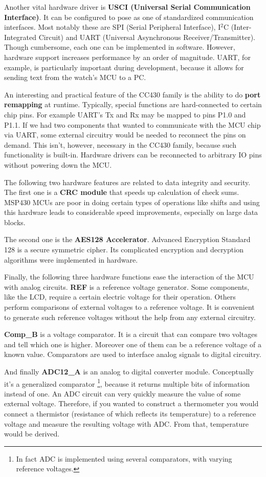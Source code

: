 Another vital hardware driver is {\bf USCI (Universal Serial
Communication Interface)}. It can be configured to pose as one of
standardized communication interfaces. Most notably these are SPI
(Serial Peripheral Interface), I$^2$C (Inter-Integrated Circuit) and
UART (Universal Asynchronous Receiver/Transmitter). Though cumbersome,
each one can be implemented in software. However, hardware support
increases performance by an order of magnitude. UART, for example, is
particularly important during development, because it allows for sending
text from the watch's MCU to a PC.

An interesting and practical feature of the CC430 family is the
ability to do {\bf port remapping} at runtime. Typically, special
functions are hard-connected to certain chip pins. For example UART's
Tx and Rx may be mapped to pins P1.0 and P1.1. If we had two
components that wanted to communicate with the MCU chip via UART, some
external circuitry would be needed to reconnect the pins on demand.
This isn't, however, necessary in the CC430 family, because such
functionality is built-in. Hardware drivers can be reconnected to
arbitrary IO pins without powering down the MCU.

The following two hardware features are related to data integrity and
security. The first one is a {\bf CRC module} that speeds up
calculation of check sums.  MSP430 MCUs are poor in doing certain
types of operations like shifts and using this hardware leads to
considerable speed improvements, especially on large data blocks.

The second one is the {\bf AES128 Accelerator}. Advanced Encryption
Standard 128 is a secure symmetric cipher. Its complicated
encryption and decryption algorithms were implemented in hardware.

Finally, the following three hardware functions ease the interaction
of the MCU with analog circuits.  {\bf REF} is a reference voltage
generator. Some components, like the LCD, require a certain electric
voltage for their operation.  Others perform comparisons of external
voltages to a reference voltage. It is convenient to generate such
reference voltages without the help from any external circuitry.

{\bf Comp\_B} is a voltage comparator. It is a circuit that can
compare two voltages and tell which one is higher. Moreover one of
them can be a reference voltage of a known value. Comparators are used
to interface analog signals to digital circuitry.

And finally {\bf ADC12\_A} is an analog to digital converter
module. Conceptually it's a generalized comparator \footnote{In
fact ADC is implemented using several comparators, with varying
reference voltages.}, because it returns multiple bits of information
instead of one.  An ADC circuit can very quickly measure the value of
some external voltage. Therefore, if you wanted to construct a thermometer
you would connect a thermistor (resistance of which reflects its
temperature) to a reference voltage and measure the resulting
voltage with ADC. From that, temperature would be derived.

